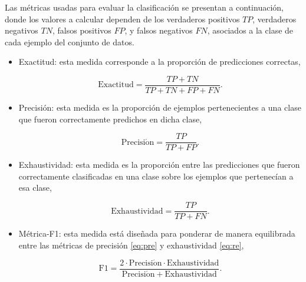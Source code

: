 Las métricas usadas para evaluar la clasificación se presentan a continuación, donde los valores a calcular dependen de los verdaderos positivos $TP$, verdaderos negativos $TN$, falsos positivos $FP$, y falsos negativos $FN$, asociados a la clase de cada ejemplo del conjunto de datos.


\begin{itemize}[label={\raisebox{0.15ex}{\rule{0.45ex}{0.45ex}}},leftmargin=1.5em,labelsep=0.6em,itemsep=0.4\baselineskip,topsep=0.3\baselineskip]
    \item Exactitud: esta medida corresponde a la proporción de predicciones correctas,

    \begin{equation}
        \mathrm{Exactitud}= \frac{TP+TN}{TP+TN+FP+FN}.
        \label{eq:acc}
    \end{equation}


    \item Precisión: esta medida es la proporción de ejemplos pertenecientes a una clase que fueron correctamente predichos en dicha clase,
    
        \begin{equation}
            \mathrm{Precisi\acute{o}n} = \frac{TP}{TP+FP}.
            \label{eq:pre}
        \end{equation}
        
    \item Exhaustividad: esta medida es la proporción entre las predicciones que fueron correctamente clasificadas en una clase sobre los ejemplos que pertenecían a esa clase,
    
    \begin{equation}
        \mathrm{Exhaustividad}= \frac{TP}{TP+FN}.
        \label{eq:re}
    \end{equation}

    \item Métrica-F1: esta medida está diseñada para ponderar de manera equilibrada entre las métricas de precisión \eqref{eq:pre} y exhaustividad \eqref{eq:re},
    
    \begin{equation}
        \mathrm{F1} = \frac{2\cdot\mathrm{Precisi\acute{o}n}\cdot\mathrm{Exhaustividad}}{\mathrm{Precisi\acute{o}n}+\mathrm{Exhaustividad}}.
        \label{eq:f1}
    \end{equation}

\end{itemize}
